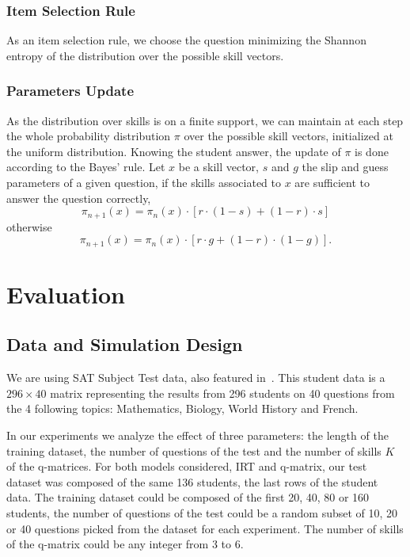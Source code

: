 \documentclass{sig-alternate}
\begin{document}
\subsubsection{Item Selection Rule}

As an item selection rule, we choose the question minimizing the Shannon entropy of the distribution over the possible skill vectors.

\subsubsection{Parameters Update}

As the distribution over skills is on a finite support, we can maintain at each step the whole probability distribution $\pi$ over the possible skill vectors, initialized at the uniform distribution.
Knowing the student answer, the update of $\pi$ is done according to the Bayes' rule. Let $x$ be a skill vector, $s$ and $g$ the slip and guess parameters of a given question, if the skills associated to $x$ are sufficient to answer the question correctly,
\[ \pi_{n+1}(x) = \pi_n(x) \cdot [r\cdot(1-s) + (1-r)\cdot s] \]
otherwise
\[ \pi_{n+1}(x) = \pi_n(x) \cdot [r\cdot g + (1-r)\cdot(1-g)]. \]

\section{Evaluation}

\subsection{Data and Simulation Design} %

We are using SAT Subject Test data, also featured in~\citep{Winters2005, Desmarais2011}. This student data is a $296 \times 40$ matrix representing the results from 296 students on 40 questions from the 4 following topics: Mathematics, Biology, World History and French.

In our experiments we analyze the effect of three parameters: the length of the training dataset, the number of questions of the test and the number of skills $K$ of the q-matrices. For both models considered, IRT and q-matrix, our test dataset was composed of the same 136 students, the last rows of the student data. The training dataset could be composed of the first 20, 40, 80 or 160 students, the number of questions of the test could be a random subset of 10, 20 or 40 questions picked from the dataset for each experiment. The number of skills of the q-matrix could be any integer from 3 to 6.
\end{document}
